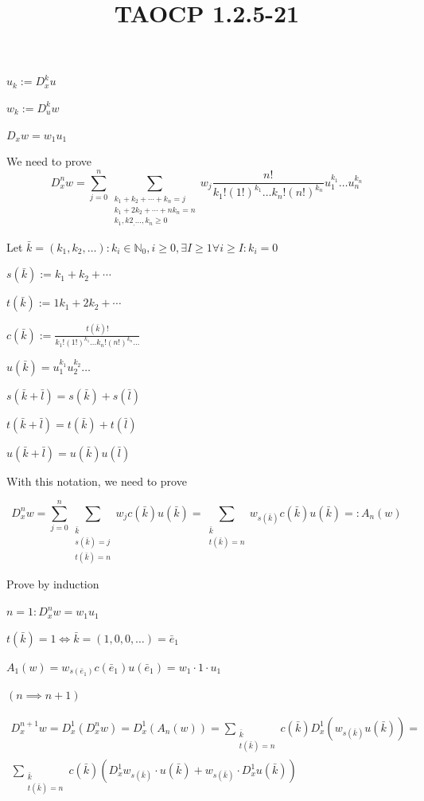 \documentclass{article}
\title{TAOCP 1.2.5\mbox{-}21}
\begin{document}
\maketitle

\( u_{k} := D_{x}^{k} u \)

\( w_{k} := D_{u}^{k} w \)

\( D_{x} w = w_{1} u_{1} \)

We need to prove
\[ D_{x}^{n} w = \sum_{j=0}^{n} \sum_{\substack{k_{1} + k_{2} + \cdots + k_{n} = j\\ k_{1} + 2k_{2} + \cdots + nk_{n} = n\\k_{1}, k2_, \ldots, k_{n} \geq 0}} w_{j} \frac{n!}{k_{1}!{(1!)}^{k_{1}}\ldots k_{n}! {(n!)}^{k_{n}}} u_{1}^{k_{1}}\ldots u_{n}^{k_{n}} \]

Let \( \bar{k}=(k_{1},k_{2},\ldots): k_{i} \in \mathbb{N}_{0}, i \geq 0, \exists I \geq 1 \forall i \geq I: k_{i} = 0 \)

\( s(\bar{k}) := k_{1} + k_{2} + \cdots \)

\( t(\bar{k}) := 1k_{1} + 2k_{2} + \cdots \)

\( c(\bar{k}) := \frac{t(\bar{k})!}{k_{1}!{(1!)}^{k_{1}}\ldots k_{n}! {(n!)}^{k_{n}}\ldots} \)

\( u(\bar{k}) = u_{1}^{k_{1}}u_{2}^{k_{2}}\ldots \)

\( s(\bar{k} + \bar{l}) = s(\bar{k}) + s(\bar{l}) \)

\( t(\bar{k} + \bar{l}) = t(\bar{k}) + t(\bar{l}) \)

\( u(\bar{k} + \bar{l}) = u(\bar{k})u(\bar{l}) \)

With this notation, we need to prove

\[ D_{x}^{n} w = \sum_{j=0}^{n} \sum_{\substack{\bar{k}\\ s(\bar{k}) = j\\ t(\bar{k}) = n}} w_{j} c(\bar{k})u(\bar{k}) = \sum_{\substack{\bar{k}\\ t(\bar{k}) = n}} w_{s(\bar{k})} c(\bar{k})u(\bar{k}) =: A_{n}(w) \]

Prove by induction

\( n = 1: D_{x}^{n} w = w_{1}u_{1} \)

\( t(\bar{k}) = 1 \iff \bar{k} = (1,0,0,\ldots) = \bar{e}_{1} \)

 \( A_{1}(w) = w_{s(\bar{e}_{1})}c(\bar{e}_{1})u(\bar{e}_{1}) = w_{1} \cdot 1 \cdot u_{1} \)

\( (n \implies n + 1) \)

\begin{multline*}
D_{x}^{n+1} w = D_{x}^{1} (D_{x}^{n} w) = D_{x}^{1}(A_{n}(w)) = \sum_{\substack{\bar{k}\\ t(\bar{k}) = n}} c(\bar{k}) D_{x}^{1}(w_{s(\bar{k})} u(\bar{k})) = \\
\sum_{\substack{\bar{k}\\ t(\bar{k}) = n}} c(\bar{k})(D_{x}^{1}w_{s(\bar{k})} \cdot u(\bar{k}) + w_{s(\bar{k})} \cdot D_{x}^{1} u(\bar{k}))
\end{multline*}
\end{document}
